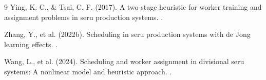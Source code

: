 \documentclass[withoutpreface,bwprint]{cumcmthesis} %
\begin{document}
\begin{thebibliography}{9}
Ying, K. C., \& Tsai, C. F. (2017). 
\newblock A two-stage heuristic for worker training and assignment problems in seru production systems.
.

Zhang, Y., et al. (2022b). 
\newblock Scheduling in seru production systems with de Jong learning effects.
.

Wang, L., et al. (2024). 
\newblock Scheduling and worker assignment in divisional seru systems: A nonlinear model and heuristic approach.
.

\end{thebibliography}

\newpage
\begin{appendices}


\end{appendices}
\end{document}
